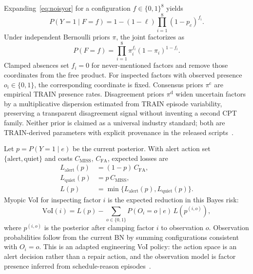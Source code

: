 
Expanding~\eqref{eq:noisyor} for a configuration $f\in\{0,1\}^{8}$ yields
\begin{equation}
P(Y{=}1\mid F{=}f)=1-(1-\ell)\prod_{i=1}^{8}(1-p_c)^{f_i}.
\label{eq:noisyor2}
\end{equation}
Under independent Bernoulli priors $\pi$, the joint factorizes as
\begin{equation}
P(F{=}f)=\prod_{i=1}^{8}\pi_i^{f_i}(1-\pi_i)^{1-f_i}.
\label{eq:prior}
\end{equation}
Clamped absences set $f_i{=}0$ for never-mentioned factors and remove those coordinates from the free product. For inspected factors with observed presence $o_i{\in}\{0,1\}$, the corresponding coordinate is fixed. Consensus priors $\pi^{\mathrm{c}}$ are empirical TRAIN presence rates. Disagreement priors $\pi^{\mathrm{d}}$ widen uncertain factors by a multiplicative dispersion estimated from TRAIN episode variability, preserving a transparent disagreement signal without inventing a second CPT family. Neither prior is claimed as a universal industry standard; both are TRAIN-derived parameters with explicit provenance in the released scripts~\cite{Heckerman1996,Onisko2001}.

Let $p=P(Y{=}1\mid e)$ be the current posterior. With alert action set $\{\mathrm{alert},\mathrm{quiet}\}$ and costs $C_{\mathrm{MISS}}$, $C_{\mathrm{FA}}$, expected losses are
\begin{align}
L_{\mathrm{alert}}(p)&=(1-p)\,C_{\mathrm{FA}},\\
L_{\mathrm{quiet}}(p)&=p\,C_{\mathrm{MISS}},\\
L(p)&=\min\{L_{\mathrm{alert}}(p),L_{\mathrm{quiet}}(p)\}.
\end{align}
Myopic VoI for inspecting factor $i$ is the expected reduction in this Bayes risk:
\begin{equation}
\mathrm{VoI}(i)=L(p)-\sum_{o\in\{0,1\}}P(O_i{=}o\mid e)\,L\!\left(p^{(i,o)}\right),
\label{eq:voi2}
\end{equation}
where $p^{(i,o)}$ is the posterior after clamping factor $i$ to observation $o$. Observation probabilities follow from the current BN by summing configurations consistent with $O_i{=}o$. This is an adapted engineering VoI policy: the action space is an alert decision rather than a repair action, and the observation model is factor presence inferred from schedule-reason episodes~\cite{Howard1966,Memarzadeh2016,Song2021}.


